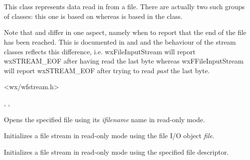 \section{}\label{wxfileinputstream}

This class represents data read in from a file. There are actually
two such groups of classes: this one is based on  
whereas  is based in
the  class.

Note that  and  differ
in one aspect, namely when to report that the end of the file has been
reached. This is documented in  and 
 and the behaviour of the stream
classes reflects this difference, i.e. wxFileInputStream will report
wxSTREAM\_EOF after having read the last byte whereas wxFFileInputStream
will report wxSTREAM\_EOF after trying to read {\it past} the last byte.




<wx/wfstream.h>


, , 




Opens the specified file using its {\it ifilename} name in read-only mode.


Initializes a file stream in read-only mode using the file I/O object {\it file}.


Initializes a file stream in read-only mode using the specified file descriptor.

